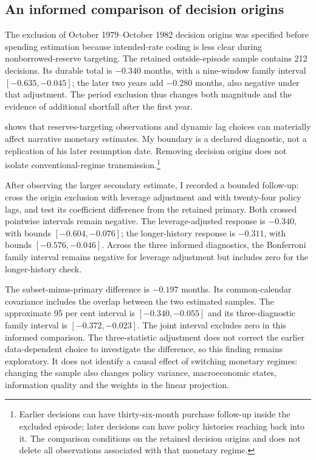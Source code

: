 \documentclass[11pt,a4paper]{article}
\begin{document}
\subsection{An informed comparison of decision origins}

The exclusion of October 1979--October 1982 decision origins was specified before spending estimation because intended-rate coding is less clear during nonborrowed-reserve targeting. The retained outside-episode sample contains 212 decisions. Its durable total is $-0.340$ months, with a nine-window family interval $[-0.635,-0.045]$; the later two years add $-0.280$ months, also negative under that adjustment. The period exclusion thus changes both magnitude and the evidence of additional shortfall after the first year.

\citet{Coibion2012} shows that reserves-targeting observations and dynamic lag choices can materially affect narrative monetary estimates. My boundary is a declared diagnostic, not a replication of his later resumption date. Removing decision origins does not isolate conventional-regime transmission.\footnote{Earlier decisions can have thirty-six-month purchase follow-up inside the excluded episode; later decisions can have policy histories reaching back into it. The comparison conditions on the retained decision origins and does not delete all observations associated with that monetary regime.}

After observing the larger secondary estimate, I recorded a bounded follow-up: cross the origin exclusion with leverage adjustment and with twenty-four policy lags, and test its coefficient difference from the retained primary. Both crossed pointwise intervals remain negative. The leverage-adjusted response is $-0.340$, with bounds $[-0.604,-0.076]$; the longer-history response is $-0.311$, with bounds $[-0.576,-0.046]$. Across the three informed diagnostics, the Bonferroni family interval remains negative for leverage adjustment but includes zero for the longer-history check.

The subset-minus-primary difference is $-0.197$ months. Its common-calendar covariance includes the overlap between the two estimated samples. The approximate 95 per cent interval is $[-0.340,-0.055]$ and its three-diagnostic family interval is $[-0.372,-0.023]$. The joint interval excludes zero in this informed comparison. The three-statistic adjustment does not correct the earlier data-dependent choice to investigate the difference, so this finding remains exploratory. It does not identify a causal effect of switching monetary regimes: changing the sample also changes policy variance, macroeconomic states, information quality and the weights in the linear projection.
\end{document}
